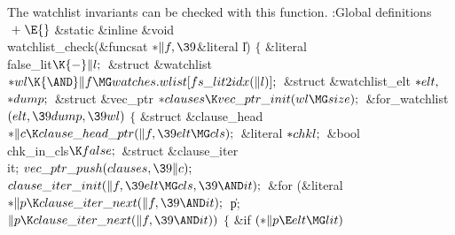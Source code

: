 The watchlist invariants can be checked with this function.
\Y\B\4:Global definitions\X${}\mathrel+\E{}$\6
\&{static} \&{inline} \&{void} \\{watchlist\_check}(\&{funcsat} ${}{*}\|f,%
\39{}$\&{literal} \|l)\1\1\2\2\6
${}\{{}$\1\6
\&{literal} \\{false\_lit}${}\K{-}\|l;{}$\6
\&{struct} \&{watchlist} ${}{*}\\{wl}\K{\AND}\|f\MG\\{watches}.\\{wlist}[\\{fs%
\_lit2idx}(\|l)];{}$\6
\&{struct} \&{watchlist\_elt} ${}{*}\\{elt},{}$ ${}{*}\\{dump};{}$\6
\&{struct} \&{vec\_ptr} ${}{*}\\{clauses}\K\\{vec\_ptr\_init}(\\{wl}\MG%
\\{size});{}$\7
\&{for\_watchlist} ${}(\\{elt},\39\\{dump},\39\\{wl}){}$\5
${}\{{}$\1\6
\&{struct} \&{clause\_head} ${}{*}\|c\K\\{clause\_head\_ptr}(\|f,\39\\{elt}\MG%
\\{cls});{}$\6
\&{literal} ${}{*}\\{chkl};{}$\6
\&{bool} \\{chk\_in\_cls}${}\K\\{false};{}$\6
\&{struct} \&{clause\_iter} \\{it};\7
${}\\{vec\_ptr\_push}(\\{clauses},\39\|c);{}$\6
${}\\{clause\_iter\_init}(\|f,\39\\{elt}\MG\\{cls},\39{\AND}\\{it});{}$\6
\&{for} (\&{literal} ${}{*}\|p\K\\{clause\_iter\_next}(\|f,\39{\AND}\\{it});{}$
\|p; ${}\|p\K\\{clause\_iter\_next}(\|f,\39{\AND}\\{it})){}$\5
${}\{{}$\1\6
\&{if} ${}({*}\|p\E\\{elt}\MG\\{lit}){}$\5
